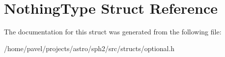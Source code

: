 \hypertarget{structNothingType}{}\section{Nothing\+Type Struct Reference}
\label{structNothingType}


The documentation for this struct was generated from the following file\+:\begin{DoxyCompactItemize}
\item 
/home/pavel/projects/astro/sph2/src/structs/optional.\+h\end{DoxyCompactItemize}
